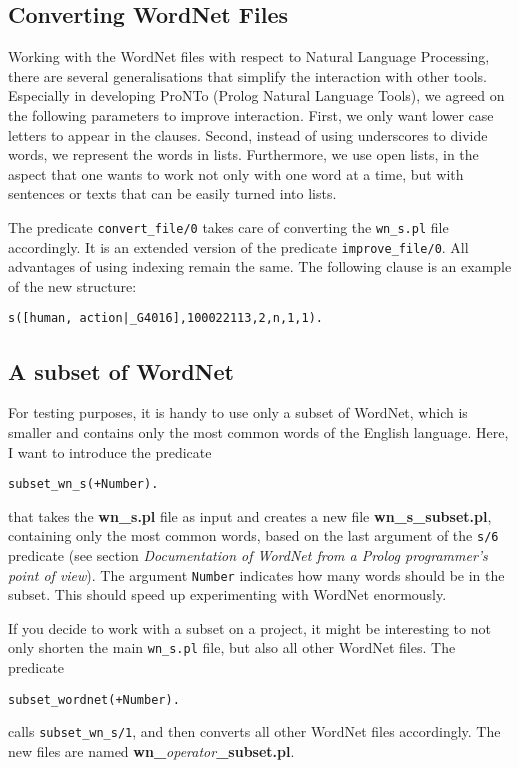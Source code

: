 \documentclass[12pt]{article}
\begin{document}
\subsection{Converting WordNet Files}

Working with the WordNet files with respect to Natural Language Processing, there are several generalisations that simplify
the interaction with other tools. Especially in developing ProNTo (Prolog Natural Language Tools), we agreed on the
following parameters to improve interaction. First, we only want lower case letters to appear in the clauses. Second, instead of
using underscores to divide words, we represent the words in lists. Furthermore, we use open lists, in the aspect
that one wants to work not only with one word at a time, but with sentences or texts that can be easily turned into lists.

The predicate {\tt convert\_file/0} takes care of converting the {\tt wn\_s.pl} file accordingly.
It is an extended version of the predicate {\tt improve\_file/0}. All advantages of using indexing remain the same.
The following clause is an example of the new structure:
\begin{verbatim}
s([human, action|_G4016],100022113,2,n,1,1).
\end{verbatim}

\subsection{A subset of WordNet}

For testing purposes, it is handy to use only a subset of WordNet, which is smaller and contains only the most common
words of the English language. Here, I want to introduce  the predicate
\begin{verbatim}
subset_wn_s(+Number).
\end{verbatim}
that takes the {\bfseries wn\_s.pl} file as input and creates a new file {\bfseries wn\_s\_subset.pl},
containing only the most common words, based on the last argument of the {\tt s/6} predicate (see
section \emph{Documentation of WordNet from a Prolog programmer's point of view}).
The argument {\tt Number} indicates how many words should be in the subset.
This should speed up experimenting with WordNet enormously.

If you decide to work with a subset on a project, it might
be interesting to not only shorten the main {\tt wn\_s.pl} file, but also all other WordNet files. The predicate
\begin{verbatim}
subset_wordnet(+Number).
\end{verbatim}
calls {\tt subset\_wn\_s/1}, and then converts all other WordNet files accordingly. The new files are named
{\bfseries wn\_}\emph{operator}{\bfseries \_subset.pl}.
\end{document}
